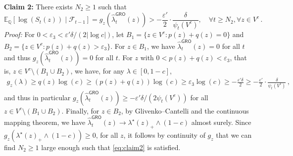 \documentclass[12pt,twoside]{article}
\theoremstyle{plain}
\theoremstyle{definition}
\theoremstyle{remark}
\newcommand{\calF}{\mathcal{F}}
\newcommand{\Esymb}{\mathbb{E}}
\newcommand{\Qsymb}{\mathbb{Q}}
\renewcommand{\epsilon}{\varepsilon}
\begin{document}
 \textbf{Claim 2:} There exists $N_2\geq 1$ such that 
    \begin{equation}\label{eq:claim2}
\Esymb_{\Qsymb}[\log (S_t(z)) \mid \calF_{t-1}]=g_z(\hat{\lambda}_t^\textsf{GRO}(z))>-\frac{\epsilon'}{2}\cdot\frac{\delta}{\psi_t(V^c)}, \quad \forall t\geq N_2, \forall z \in V^c\,.
    \end{equation}
\emph{Proof:} For $0<\epsilon_3< \epsilon' \delta/(2|\log c|)$, let $B_1=\{z\in V^c : p(z)+q(z)=0\}$ and $B_2=\{z \in V^c: p(z)+q(z)>\epsilon_3\}$. For $z\in B_1$, we have $\hat{\lambda}_t^\textsf{GRO}(z)=0$ for all $t$ and thus $g_z(\hat{\lambda}_t^\textsf{GRO}(z))=0$ for all $t$. For $z$ with $0<p(z)+q(z) < \epsilon_3$, that is, $z\in V^c \setminus (B_1 \cup B_2)$, we have, for any $\lambda\in [0,1-c]$, 
\begin{align*}
    g_z(\lambda) \geq q(z)\log (c)\geq  (p(z)+q(z))\log (c)\geq \epsilon_3 \log (c)\geq -\frac{\epsilon' \delta}{2}\geq-\frac{\epsilon'}{2}\cdot\frac{\delta}{\psi_t(V^c)}\,,
\end{align*}
and thus in particular $g_z(\hat{\lambda}_t^\textsf{GRO}(z))\geq -{\epsilon' \delta}/{(2 \psi_t(V^c))}$ for all $z\in V^c\setminus (B_1 \cup B_2)$. Finally, for $z \in B_2$, by Glivenko–Cantelli and the continuous mapping theorem, we have 
$\hat{\lambda}_t^\textsf{GRO}(z) \to \lambda^\star(z)_+ \land(1-c)$ almost surely. Since $g_z(\lambda^\star(z)_+ \land(1-c))\geq 0$, for all $z$, it follows by continuity of $g_z$ that we can find $N_2\geq 1$ large enough such that \eqref{eq:claim2} is satisfied. 
\end{document}
